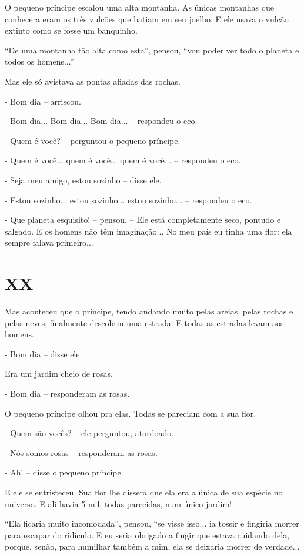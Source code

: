 O pequeno príncipe escalou uma alta montanha. As únicas montanhas que
conhecera eram os três vulcões que batiam em seu joelho. E ele usava o
vulcão extinto como se fosse um banquinho.

``De uma montanha tão alta como esta'', pensou, ``vou poder ver todo o
planeta e todos os homens...''

Mas ele só avistava as pontas afiadas das rochas.

- Bom dia -- arriscou.

- Bom dia... Bom dia... Bom dia... -- respondeu o eco.

- Quem é você? -- perguntou o pequeno príncipe.

- Quem é você... quem é você... quem é você... -- respondeu o eco.

- Seja meu amigo, estou sozinho -- disse ele.

- Estou sozinho... estou sozinho... estou sozinho... -- respondeu o eco.

- Que planeta esquisito! -- pensou. -- Ele está completamente seco,
pontudo e salgado. E os homens não têm imaginação... No meu país eu
tinha uma flor: ela sempre falava primeiro...

\chapter{XX}

Mas aconteceu que o príncipe, tendo andando muito pelas areias, pelas
rochas e pelas neves, finalmente descobriu uma estrada. E todas as
estradas levam aos homens.

- Bom dia -- disse ele.

Era um jardim cheio de rosas.

- Bom dia -- responderam as rosas.

O pequeno príncipe olhou pra elas. Todas se pareciam com a sua flor.

- Quem são vocês? -- ele perguntou, atordoado.

- Nós somos rosas -- responderam as rosas.

- Ah! -- disse o pequeno príncipe.

E ele se entristeceu. Sua flor lhe dissera que ela era a única de sua
espécie no universo. E ali havia 5 mil, todas parecidas, num único
jardim!

``Ela ficaria muito incomodada'', pensou, ``se visse isso... ia tossir e
fingiria morrer para escapar do ridículo. E eu seria obrigado a fingir
que estava cuidando dela, porque, senão, para humilhar também a mim, ela
se deixaria morrer de verdade...

